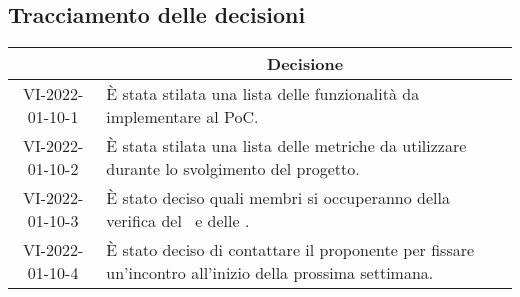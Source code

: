 \pagebreak

\subsection{Tracciamento delle decisioni}

\begin{table}[H]
	\centering
	\renewcommand{\arraystretch}{1.8}
	\begin{tabular}{c | p{10cm}}
		\rowcolor[HTML]{125E28}
		\multicolumn{1}{c}{\color[HTML]{FFFFFF} \textbf{ID}} &
		\multicolumn{1}{c}{\color[HTML]{FFFFFF} \textbf{Decisione}} \\
		\hline
		VI-2022-01-10-1 & È stata stilata una lista delle funzionalità da implementare al PoC\glo{}.\\ \hline
		VI-2022-01-10-2 & È stata stilata una lista delle metriche da utilizzare durante lo svolgimento del progetto.\\ \hline
		VI-2022-01-10-3 & È stato deciso quali membri si occuperanno della verifica del \docNamePdPLow\ e delle \docNameNdPLow.\\ \hline
		VI-2022-01-10-4 & È stato deciso di contattare il proponente per fissare un'incontro all'inizio della prossima settimana.\\ \hline
		
	\end{tabular}
\end{table}